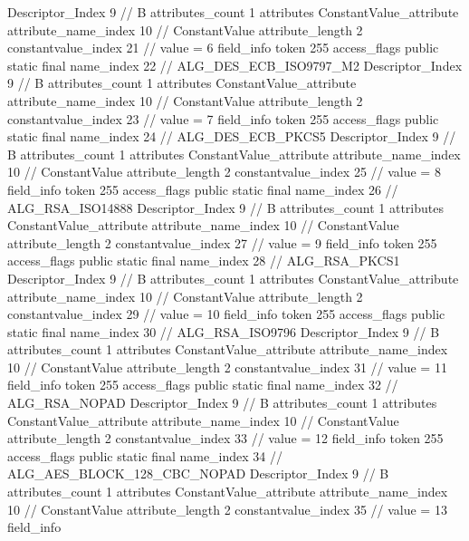 {{{{{				Descriptor_Index	9		// B
				attributes_count	1
				attributes {
				ConstantValue_attribute {
					attribute_name_index	10		// ConstantValue
					attribute_length	2
					constantvalue_index	21		// value = 6
				}
				}
			}
			field_info {
				token	255
				access_flags	public static final
				name_index	22		// ALG_DES_ECB_ISO9797_M2
				Descriptor_Index	9		// B
				attributes_count	1
				attributes {
				ConstantValue_attribute {
					attribute_name_index	10		// ConstantValue
					attribute_length	2
					constantvalue_index	23		// value = 7
				}
				}
			}
			field_info {
				token	255
				access_flags	public static final
				name_index	24		// ALG_DES_ECB_PKCS5
				Descriptor_Index	9		// B
				attributes_count	1
				attributes {
				ConstantValue_attribute {
					attribute_name_index	10		// ConstantValue
					attribute_length	2
					constantvalue_index	25		// value = 8
				}
				}
			}
			field_info {
				token	255
				access_flags	public static final
				name_index	26		// ALG_RSA_ISO14888
				Descriptor_Index	9		// B
				attributes_count	1
				attributes {
				ConstantValue_attribute {
					attribute_name_index	10		// ConstantValue
					attribute_length	2
					constantvalue_index	27		// value = 9
				}
				}
			}
			field_info {
				token	255
				access_flags	public static final
				name_index	28		// ALG_RSA_PKCS1
				Descriptor_Index	9		// B
				attributes_count	1
				attributes {
				ConstantValue_attribute {
					attribute_name_index	10		// ConstantValue
					attribute_length	2
					constantvalue_index	29		// value = 10
				}
				}
			}
			field_info {
				token	255
				access_flags	public static final
				name_index	30		// ALG_RSA_ISO9796
				Descriptor_Index	9		// B
				attributes_count	1
				attributes {
				ConstantValue_attribute {
					attribute_name_index	10		// ConstantValue
					attribute_length	2
					constantvalue_index	31		// value = 11
				}
				}
			}
			field_info {
				token	255
				access_flags	public static final
				name_index	32		// ALG_RSA_NOPAD
				Descriptor_Index	9		// B
				attributes_count	1
				attributes {
				ConstantValue_attribute {
					attribute_name_index	10		// ConstantValue
					attribute_length	2
					constantvalue_index	33		// value = 12
				}
				}
			}
			field_info {
				token	255
				access_flags	public static final
				name_index	34		// ALG_AES_BLOCK_128_CBC_NOPAD
				Descriptor_Index	9		// B
				attributes_count	1
				attributes {
				ConstantValue_attribute {
					attribute_name_index	10		// ConstantValue
					attribute_length	2
					constantvalue_index	35		// value = 13
				}
				}
			}
			field_info {
}}}}}

